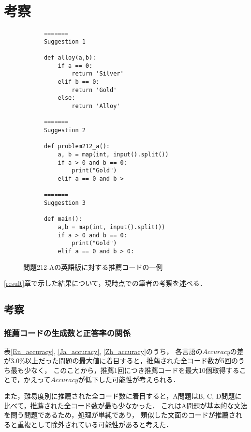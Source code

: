 \section{考察\label{discussion}}
  \begin{figure}[t]
    \begin{verbatim}
      =======
      Suggestion 1

      def alloy(a,b):
          if a == 0:
              return 'Silver'
          elif b == 0:
              return 'Gold'
          else:
              return 'Alloy'

      =======
      Suggestion 2

      def problem212_a():
          a, b = map(int, input().split())
          if a > 0 and b == 0:
              print("Gold")
          elif a == 0 and b >

      =======
      Suggestion 3

      def main():
          a,b = map(int, input().split())
          if a > 0 and b == 0:
              print("Gold")
          elif a == 0 and b > 0:
    \end{verbatim}
    \caption{問題212-Aの英語版に対する推薦コードの一例}
    \label{recommend_212_A_en}
  \end{figure}
  \ref{result}章で示した結果について，現時点での筆者の考察を述べる．
  \vspace{-1zh}
  \subsection{考察\label{consideration}}
  \subsubsection{推薦コードの生成数と正答率の関係}
  表\ref{En_accuracy}, \ref{Ja_accuracy}, \ref{Zh_accuracy}のうち，
  各言語の$Accuracy$の差が3.0\%以上だった問題の最大値に着目すると，推薦された全コード数が5回のうち最も少なく，
  このことから，推薦1回につき推薦コードを最大10個取得することで，かえって$Accuracy$が低下した可能性が考えられる．

  また，難易度別に推薦された全コード数に着目すると，A問題はB, C, D問題に比べて，推薦された全コード数が最も少なかった．
  これはA問題が基本的な文法を問う問題であるため，処理が単純であり，
  類似した文面のコードが推薦されると重複として除外されている可能性があると考えた．

